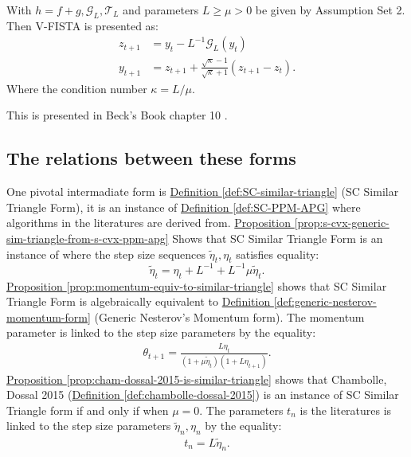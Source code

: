 \documentclass[12pt]{article}
\begin{document}
        \begin{definition}[V-FISTA]\label{def:v-fista}
            With $h = f + g, \mathcal G_L, \mathcal T_L$ and parameters $L \ge \mu > 0$  be given by Assumption Set 2. 
            Then V-FISTA is presented as: 
            \begin{align*}
                z_{t + 1} 
                &= y_t - L^{-1}\mathcal G_L(y_t)
                \\
                y_{t + 1} &= z_{t + 1} + 
                \frac{\sqrt{\kappa} - 1}{\sqrt{\kappa} + 1}
                (z_{t +1} - z_t). 
            \end{align*}
            Where the condition number $\kappa = L/\mu$. 
        \end{definition}
        \begin{remark}
            This is presented in Beck's Book chapter 10 \cite[(10.7.7)]{beck_first-order_2017}. 
        \end{remark}

    \subsection{The relations between these forms}
        One pivotal intermadiate form is 
        \hyperref[def:SC-similar-triangle]
        { Definition \ref*{def:SC-similar-triangle}} 
        (SC Similar Triangle Form), it is an instance of
        \hyperref[def:SC-PPM-APG]
        {Definition \ref*{def:SC-PPM-APG}}
        where algorithms in the literatures are derived from. 
        \hyperref[prop:s-cvx-generic-sim-triangle-from-s-cvx-ppm-apg]
        {Proposition \ref*{prop:s-cvx-generic-sim-triangle-from-s-cvx-ppm-apg}}
        Shows that SC Similar Triangle Form is an instance of \SCPPMAPG where the step size sequences $\tilde \eta_t, \eta_t$ satisfies equality: 
        $$
            \tilde \eta_t =\eta_t + L^{-1} + L^{-1}\mu \tilde \eta_t. 
        $$
        \hyperref[prop:momentum-equiv-to-similar-triangle]
        {Proposition \ref*{prop:momentum-equiv-to-similar-triangle}}
        shows that SC Similar Triangle Form is algebraically equivalent to 
        \hyperref[def:generic-nesterov-momentum-form]{Definition \ref*{def:generic-nesterov-momentum-form}} (Generic Nesterov's Momentum form).
        The momentum parameter is linked to the step size parameters by the equality: 
        \begin{align*}
            \theta_{t + 1} = \frac{L\eta_t}{(1 + \mu \tilde\eta_{t})(1 + L\eta_{t + 1})}.
        \end{align*} 
        \hyperref[prop:cham-dossal-2015-is-similar-triangle]
        {Proposition \ref{prop:cham-dossal-2015-is-similar-triangle}}
        shows that Chambolle, Dossal 2015 (\hyperref[def:chambolle-dossal-2015]
            {Definition \ref*{def:chambolle-dossal-2015}})
        is an instance of SC Similar Triangle form if and only if when $\mu = 0$. 
        The parameters $t_n$ is the literatures is linked to the step size parameters $\tilde \eta_n, \eta_n$ by the equality: 
        \begin{align*}
            t_n = L \tilde \eta_n. 
        \end{align*}
\end{document}
